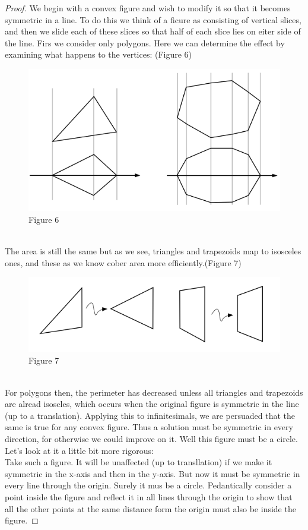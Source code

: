 \documentclass[12pt, a4paper, titlepage]{article}
\begin{document}
\begin{proof}
We begin with a convex figure and wish to modify it so that it becomes symmetric in a line. To do this we think of a ficure as consisting of vertical slices, and then we slide each of these slices so that half of each slice lies on eiter side of the line. Firs we consider only polygons. Here we can determine the effect by examining what happens to the vertices: (Figure 6)\\
\begin{figure}[h]
\includegraphics[scale=0.5]{images/Figure6}
\centering
Figure 6
\centering
\end{figure}
\\
The area is still the same but as we see, triangles and trapezoids map to isosceles ones, and these as we know cober area more efficiently.(Figure 7)\\
\begin{figure}[h]
\includegraphics[scale=0.5]{images/Figure7}
\centering
Figure 7
\centering
\end{figure}
\\
For polygons then, the perimeter has decreased unless all triangles and trapezoids are alread isoscles, which occurs when the original figure is symmetric in the line (up to a translation). Applying this to infinitesimals, we are persuaded that the same is true for any convex figure. Thus a solution must be symmetric in every direction, for otherwise we could improve on it. Well this figure must be a circle. Let's look at it a little bit more rigorous:\\
Take such a figure. It will be unaffected (up to transllation) if we make it symmetric in the x-axis and then in the y-axis. But now it must be symmetric in every line through the origin. Surely it mus be a circle. Pedantically consider a point inside the figure and reflect it in all lines through the origin to show that all the other points at the same distance form the origin must also be inside the figure.

\end{proof}
\end{document}
